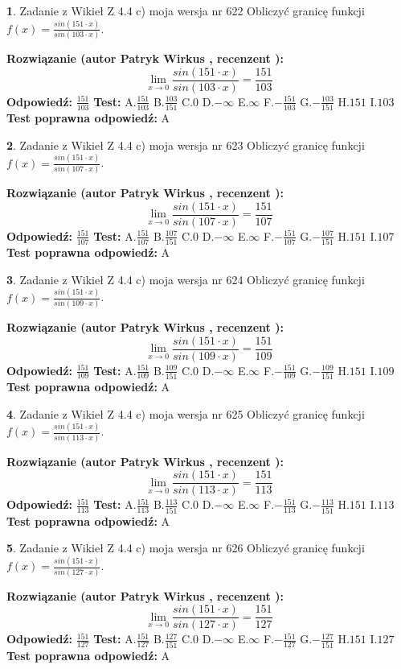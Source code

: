 \documentclass[12pt, a4paper]{article}
\theoremstyle{definition} %
\newtheorem{zad}{}
\newcommand{\zadStart}[1]{\begin{zad}#1\newline}
\newcommand{\zadStop}{\end{zad}}
\newcommand{\rozwStart}[2]{\noindent \textbf{Rozwiązanie (autor #1 , recenzent #2): }\newline}
\newcommand{\rozwStop}{\newline}
\newcommand{\odpStart}{\noindent \textbf{Odpowiedź:}\newline}
\newcommand{\odpStop}{\newline}
\newcommand{\testStart}{\noindent \textbf{Test:}\newline}
\newcommand{\testStop}{\newline}
\newcommand{\kluczStart}{\noindent \textbf{Test poprawna odpowiedź:}\newline}
\newcommand{\kluczStop}{\newline}
\begin{document}
\zadStart{Zadanie z Wikieł Z 4.4 c) moja wersja nr 622}
Obliczyć granicę funkcji $f(x)=\frac{sin(151\cdot x)}{sin(103\cdot x)}$.
\zadStop
\rozwStart{Patryk Wirkus}{}
$$\lim\limits_{x\to 0}\frac{sin(151\cdot x)}{sin(103\cdot x)}=
\frac{151}{103}$$
\rozwStop
\odpStart
$\frac{151}{103}$
\odpStop
\testStart
A.$\frac{151}{103}$
B.$\frac{103}{151}$
C.$0$
D.$-\infty$
E.$\infty$
F.$-\frac{151}{103}$
G.$-\frac{103}{151}$
H.$151$
I.$103$
\testStop
\kluczStart
A
\kluczStop



\zadStart{Zadanie z Wikieł Z 4.4 c) moja wersja nr 623}
Obliczyć granicę funkcji $f(x)=\frac{sin(151\cdot x)}{sin(107\cdot x)}$.
\zadStop
\rozwStart{Patryk Wirkus}{}
$$\lim\limits_{x\to 0}\frac{sin(151\cdot x)}{sin(107\cdot x)}=
\frac{151}{107}$$
\rozwStop
\odpStart
$\frac{151}{107}$
\odpStop
\testStart
A.$\frac{151}{107}$
B.$\frac{107}{151}$
C.$0$
D.$-\infty$
E.$\infty$
F.$-\frac{151}{107}$
G.$-\frac{107}{151}$
H.$151$
I.$107$
\testStop
\kluczStart
A
\kluczStop



\zadStart{Zadanie z Wikieł Z 4.4 c) moja wersja nr 624}
Obliczyć granicę funkcji $f(x)=\frac{sin(151\cdot x)}{sin(109\cdot x)}$.
\zadStop
\rozwStart{Patryk Wirkus}{}
$$\lim\limits_{x\to 0}\frac{sin(151\cdot x)}{sin(109\cdot x)}=
\frac{151}{109}$$
\rozwStop
\odpStart
$\frac{151}{109}$
\odpStop
\testStart
A.$\frac{151}{109}$
B.$\frac{109}{151}$
C.$0$
D.$-\infty$
E.$\infty$
F.$-\frac{151}{109}$
G.$-\frac{109}{151}$
H.$151$
I.$109$
\testStop
\kluczStart
A
\kluczStop



\zadStart{Zadanie z Wikieł Z 4.4 c) moja wersja nr 625}
Obliczyć granicę funkcji $f(x)=\frac{sin(151\cdot x)}{sin(113\cdot x)}$.
\zadStop
\rozwStart{Patryk Wirkus}{}
$$\lim\limits_{x\to 0}\frac{sin(151\cdot x)}{sin(113\cdot x)}=
\frac{151}{113}$$
\rozwStop
\odpStart
$\frac{151}{113}$
\odpStop
\testStart
A.$\frac{151}{113}$
B.$\frac{113}{151}$
C.$0$
D.$-\infty$
E.$\infty$
F.$-\frac{151}{113}$
G.$-\frac{113}{151}$
H.$151$
I.$113$
\testStop
\kluczStart
A
\kluczStop



\zadStart{Zadanie z Wikieł Z 4.4 c) moja wersja nr 626}
Obliczyć granicę funkcji $f(x)=\frac{sin(151\cdot x)}{sin(127\cdot x)}$.
\zadStop
\rozwStart{Patryk Wirkus}{}
$$\lim\limits_{x\to 0}\frac{sin(151\cdot x)}{sin(127\cdot x)}=
\frac{151}{127}$$
\rozwStop
\odpStart
$\frac{151}{127}$
\odpStop
\testStart
A.$\frac{151}{127}$
B.$\frac{127}{151}$
C.$0$
D.$-\infty$
E.$\infty$
F.$-\frac{151}{127}$
G.$-\frac{127}{151}$
H.$151$
I.$127$
\testStop
\kluczStart
A
\kluczStop
\end{document}
